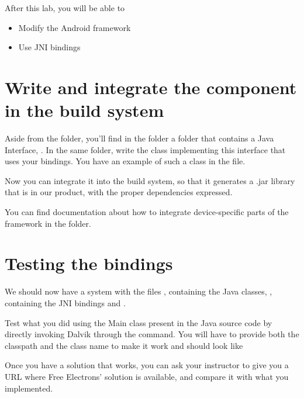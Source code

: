 
After this lab, you will be able to
\begin{itemize}
  \item Modify the Android framework
  \item Use JNI bindings
\end{itemize}

\section{Write and integrate the component in the build system}

Aside from the  folder, you'll find in the 
folder a  folder that contains a Java Interface,
. In the same folder, write the
 class implementing this interface that uses your
bindings. You have an example of such a class in the
 file.

Now you can integrate it into the build system, so that it generates a .jar
library that is in our product, with the proper dependencies expressed.

You can find documentation about how to integrate device-specific parts of the
framework in the  folder.

\section{Testing the bindings}

We should now have a system with the files
, containing the Java
classes, , containing the JNI bindings and
.

Test what you did using the Main class present in the Java source code
by directly invoking Dalvik through the 
command. You will have to provide both the classpath and the class
name to make it work and should look like

Once you have a solution that works, you can ask your instructor to 
give you a URL where Free Electrons' solution is available, and compare
it with what you implemented.
